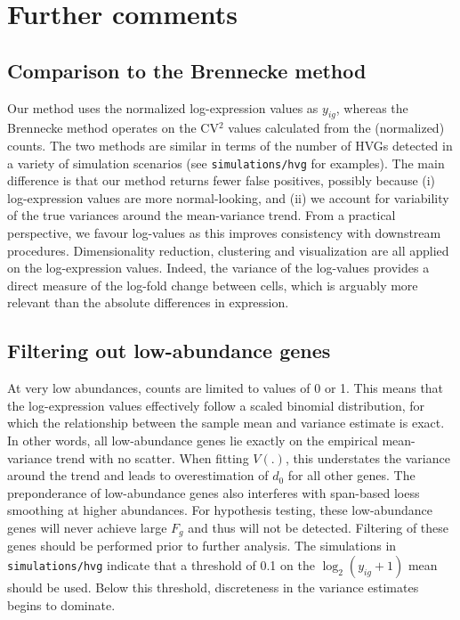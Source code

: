 \documentclass{article}
\begin{document}
\section{Further comments}

\subsection{Comparison to the Brennecke method}
Our method uses the normalized log-expression values as $y_{ig}$, whereas the Brennecke method operates on the CV$^2$ values calculated from the (normalized) counts.
The two methods are similar in terms of the number of HVGs detected in a variety of simulation scenarios (see \texttt{simulations/hvg} for examples).
The main difference is that our method returns fewer false positives, possibly because (i) log-expression values are more normal-looking, and (ii) we account for variability of the true variances around the mean-variance trend.
From a practical perspective, we favour log-values as this improves consistency with downstream procedures.
Dimensionality reduction, clustering and visualization are all applied on the log-expression values.
Indeed, the variance of the log-values provides a direct measure of the log-fold change between cells, which is arguably more relevant than the absolute differences in expression.

\subsection{Filtering out low-abundance genes}
At very low abundances, counts are limited to values of 0 or 1.
This means that the log-expression values effectively follow a scaled binomial distribution, for which the relationship between the sample mean and variance estimate is exact.
In other words, all low-abundance genes lie exactly on the empirical mean-variance trend with no scatter.
When fitting $V(.)$, this understates the variance around the trend and leads to overestimation of $d_0$ for all other genes.
The preponderance of low-abundance genes also interferes with span-based loess smoothing at higher abundances.
For hypothesis testing, these low-abundance genes will never achieve large $F_g$ and thus will not be detected.
Filtering of these genes should be performed prior to further analysis. 
The simulations in \texttt{simulations/hvg} indicate that a threshold of 0.1 on the $\log_2(y_{ig}+1)$ mean should be used.
Below this threshold, discreteness in the variance estimates begins to dominate.



\end{document}
